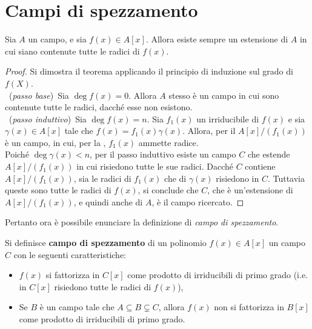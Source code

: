 \section{Campi di spezzamento}

\begin{theorem}
    \label{th:esistenza_spezzamento}
    Sia $A$ un campo, e sia $f(x) \in A[x]$.
    Allora esiste sempre un estensione di $A$ in cui siano
    contenute tutte le radici di $f(x)$.
\end{theorem}

\begin{proof}
    Si dimostra il teorema applicando il principio di induzione sul
    grado di $f(X)$. \\

    \ (\textit{passo base}) \,Sia $\deg f(x) = 0$. Allora $A$ stesso è un
    campo in cui sono contenute tutte le radici, dacché esse non esistono. \\

    \ (\textit{passo induttivo}) \,Sia $\deg f(x) = n$. Sia $f_1(x)$ un
    irriducibile di $f(x)$ e sia $\gamma(x) \in A[x]$ tale che
    $f(x)=f_1(x)\gamma(x)$. Allora, per il 
    $A[x]/(f_1(x))$ è un campo, in cui, per la ,
    $f_1(x)$ ammette radice. \\

    Poiché $\deg \gamma(x) < n$, per il passo induttivo
    esiste un campo $C$ che estende $A[x]/(f_1(x))$ in cui risiedono tutte le sue radici. Dacché $C$ contiene $A[x]/(f_1(x))$, sia le radici
    di $f_1(x)$ che di $\gamma(x)$ risiedono in $C$. Tuttavia queste sono
    tutte le radici di $f(x)$, si conclude che $C$, che è un'estensione di $A[x]/(f_1(x))$, e quindi anche di $A$, è il campo ricercato.
\end{proof}

Pertanto ora è possibile enunciare la definizione di \textit{campo di spezzamento}.

\begin{definition}
    Si definisce \textbf{campo di spezzamento} di un polinomio $f(x) \in A[x]$ un
    campo $C$ con le seguenti caratteristiche:

    \begin{itemize}
        \item $f(x)$ si fattorizza in $C[x]$ come prodotto di irriducibili di
              primo grado (i.e. in $C[x]$ risiedono tutte le radici di $f(x)$),
        \item Se $B$ è un campo tale che $A \subseteq B \subsetneq C$, allora
              $f(x)$ non si fattorizza in $B[x]$ come prodotto di irriducibili di
              primo grado.
    \end{itemize}
\end{definition}

